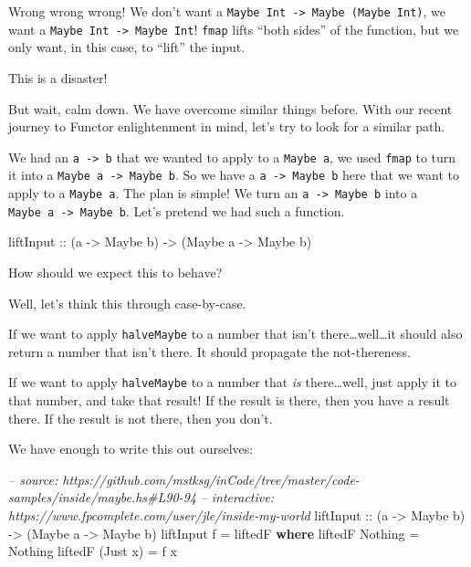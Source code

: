 \documentclass[]{article}
\newenvironment{Shaded}{\begin{snugshade}}{\end{snugshade}}
\newcommand{\CommentTok}[1]{\textcolor[rgb]{0.56,0.35,0.01}{\textit{#1}}}
\newcommand{\DataTypeTok}[1]{\textcolor[rgb]{0.13,0.29,0.53}{#1}}
\newcommand{\FunctionTok}[1]{\textcolor[rgb]{0.00,0.00,0.00}{#1}}
\newcommand{\KeywordTok}[1]{\textcolor[rgb]{0.13,0.29,0.53}{\textbf{#1}}}
\newcommand{\NormalTok}[1]{#1}
\newcommand{\OtherTok}[1]{\textcolor[rgb]{0.56,0.35,0.01}{#1}}
\begin{document}
Wrong wrong wrong! We don't want a
\texttt{Maybe\ Int\ -\textgreater{}\ Maybe\ (Maybe\ Int)}, we want a
\texttt{Maybe\ Int\ -\textgreater{}\ Maybe\ Int}! \texttt{fmap} lifts ``both
sides'' of the function, but we only want, in this case, to ``lift'' the input.

This is a disaster!

But wait, calm down. We have overcome similar things before. With our recent
journey to Functor enlightenment in mind, let's try to look for a similar path.

We had an \texttt{a\ -\textgreater{}\ b} that we wanted to apply to a
\texttt{Maybe\ a}, we used \texttt{fmap} to turn it into a
\texttt{Maybe\ a\ -\textgreater{}\ Maybe\ b}. So we have a
\texttt{a\ -\textgreater{}\ Maybe\ b} here that we want to apply to a
\texttt{Maybe\ a}. The plan is simple! We turn an
\texttt{a\ -\textgreater{}\ Maybe\ b} into a
\texttt{Maybe\ a\ -\textgreater{}\ Maybe\ b}. Let's pretend we had such a
function.

\begin{Shaded}
\begin{Highlighting}[]
\OtherTok{liftInput ::}\NormalTok{ (a }\OtherTok{->} \DataTypeTok{Maybe}\NormalTok{ b) }\OtherTok{->}\NormalTok{ (}\DataTypeTok{Maybe}\NormalTok{ a }\OtherTok{->} \DataTypeTok{Maybe}\NormalTok{ b)}
\end{Highlighting}
\end{Shaded}

How should we expect this to behave?

Well, let's think this through case-by-case.

If we want to apply \texttt{halveMaybe} to a number that isn't
there\ldots{}well\ldots{}it should also return a number that isn't there. It
should propagate the not-thereness.

If we want to apply \texttt{halveMaybe} to a number that \emph{is}
there\ldots{}well, just apply it to that number, and take that result! If the
result is there, then you have a result there. If the result is not there, then
you don't.

We have enough to write this out ourselves:

\begin{Shaded}
\begin{Highlighting}[]
\CommentTok{-- source: https://github.com/mstksg/inCode/tree/master/code-samples/inside/maybe.hs#L90-94}
\CommentTok{-- interactive: https://www.fpcomplete.com/user/jle/inside-my-world}
\OtherTok{liftInput ::}\NormalTok{ (a }\OtherTok{->} \DataTypeTok{Maybe}\NormalTok{ b) }\OtherTok{->}\NormalTok{ (}\DataTypeTok{Maybe}\NormalTok{ a }\OtherTok{->} \DataTypeTok{Maybe}\NormalTok{ b)}
\NormalTok{liftInput f }\FunctionTok{=}\NormalTok{ liftedF}
  \KeywordTok{where}
\NormalTok{    liftedF }\DataTypeTok{Nothing}  \FunctionTok{=} \DataTypeTok{Nothing}
\NormalTok{    liftedF (}\DataTypeTok{Just}\NormalTok{ x) }\FunctionTok{=}\NormalTok{ f x}
\end{Highlighting}
\end{Shaded}
\end{document}
